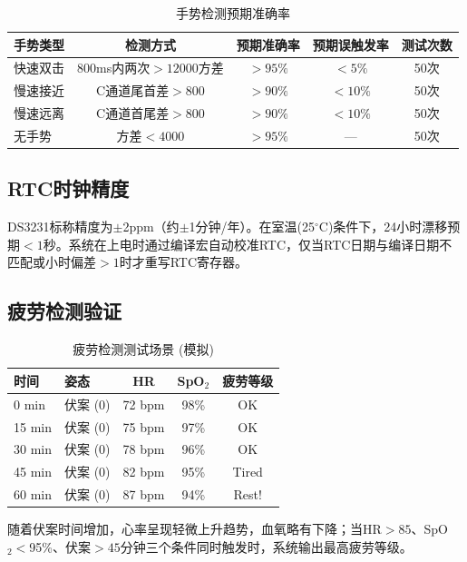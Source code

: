 \documentclass[UTF8,a4paper,12pt]{ctexart}
\begin{document}
\begin{table}[H]
\centering
\caption{手势检测预期准确率}
\begin{tabular}{@{}lcccc@{}}
\toprule
\textbf{手势类型} & \textbf{检测方式} & \textbf{预期准确率} & \textbf{预期误触发率} & \textbf{测试次数} \\
\midrule
快速双击 & 800ms内两次$>12000$方差 & $>95\%$ & $<5\%$ & 50次 \\
慢速接近 & C通道尾首差$>800$ & $>90\%$ & $<10\%$ & 50次 \\
慢速远离 & C通道首尾差$>800$ & $>90\%$ & $<10\%$ & 50次 \\
无手势 & 方差$<4000$ & $>95\%$ & — & 50次 \\
\bottomrule
\end{tabular}
\end{table}

\subsection{RTC时钟精度}

DS3231标称精度为$\pm$2ppm（约$\pm$1分钟/年）。在室温(25$^\circ$C)条件下，24小时漂移预期$<1$秒。系统在上电时通过编译宏自动校准RTC，仅当RTC日期与编译日期不匹配或小时偏差$>1$时才重写RTC寄存器。

\subsection{疲劳检测验证}

\begin{table}[H]
\centering
\caption{疲劳检测测试场景 (模拟)}
\begin{tabular}{@{}lp{2.5cm}ccc@{}}
\toprule
\textbf{时间} & \textbf{姿态} & \textbf{HR} & \textbf{SpO$_2$} & \textbf{疲劳等级} \\
\midrule
0 min & 伏案 (0) & 72 bpm & 98\% & OK \\
15 min & 伏案 (0) & 75 bpm & 97\% & OK \\
30 min & 伏案 (0) & 78 bpm & 96\% & OK \\
45 min & 伏案 (0) & 82 bpm & 95\% & Tired \\
60 min & 伏案 (0) & 87 bpm & 94\% & Rest! \\
\bottomrule
\end{tabular}
\end{table}

随着伏案时间增加，心率呈现轻微上升趋势，血氧略有下降；当HR$>85$、SpO$_2<$95\%、伏案$>45$分钟三个条件同时触发时，系统输出最高疲劳等级。
\end{document}

